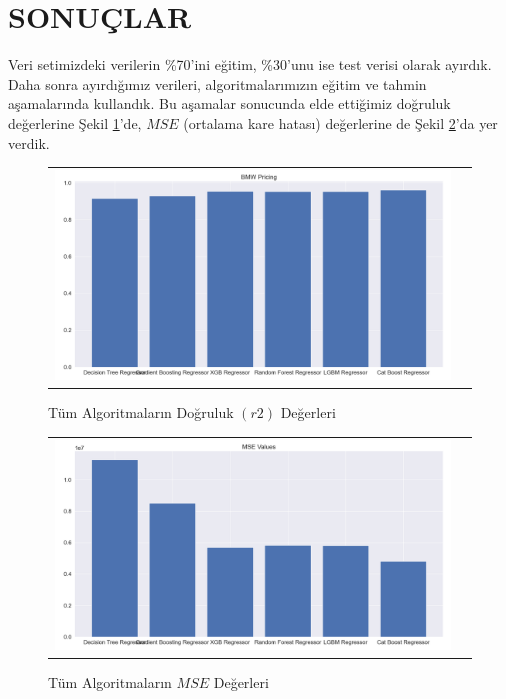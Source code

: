 \documentclass[conference]{IEEEtran}
\begin{document}
\section{\textbf{SONUÇLAR}}

\quad Veri setimizdeki verilerin \%70'ini eğitim, \%30'unu ise test verisi olarak ayırdık. Daha sonra ayırdığımız verileri, algoritmalarımızın eğitim ve tahmin aşamalarında kullandık. Bu aşamalar sonucunda elde ettiğimiz doğruluk değerlerine Şekil \ref{fig:08}'de, $MSE$ (ortalama kare hatası) değerlerine de Şekil \ref{fig:09}'da yer verdik.

\begin{figure}[!h]
	\centering
	\begin{center}
		\begin{tabular}{cc}
			\includegraphics[scale=0.175]{pictures/pic_08.png}&
		\end{tabular}
	\end{center}
	\caption{Tüm Algoritmaların Doğruluk $(r2)$ Değerleri}
	\label{fig:08}
\end{figure}

\begin{figure}[!h]
	\centering
	\begin{center}
		\begin{tabular}{cc}
			\includegraphics[scale=0.175]{pictures/pic_09.png}&
		\end{tabular}
	\end{center}
	\caption{Tüm Algoritmaların $MSE$ Değerleri}
	\label{fig:09}
\end{figure}
\end{document}
